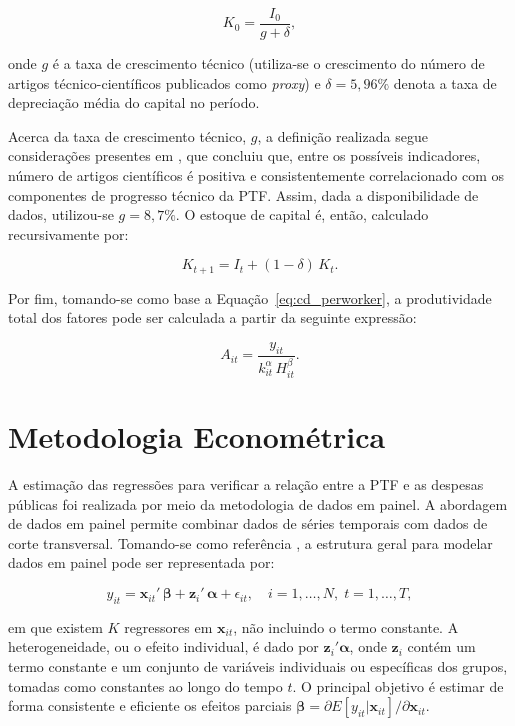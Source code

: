 \documentclass[
  12pt,
  a4paper,
  oneside,
  brazil,
  chapter=TITLE,
  section=TITLE
]{abntex2}
\begin{document}
\begin{equation}
  K_0 = \frac{I_0}{g + \delta},
  \label{eq:K0}
\end{equation}

\noindent onde $g$ é a taxa de crescimento técnico (utiliza-se o crescimento do número de artigos técnico-científicos publicados como \textit{proxy}) e $\delta = 5{,}96\%$ denota a taxa de depreciação média do capital no período.

Acerca da taxa de crescimento técnico, $g$, a definição realizada segue considerações presentes em , que concluiu que, entre os possíveis indicadores, número de artigos científicos é positiva e consistentemente correlacionado com os componentes de progresso técnico da PTF. Assim, dada a disponibilidade de dados, utilizou-se $g = 8{,}7\%$. O estoque de capital é, então, calculado recursivamente por:

\begin{equation}
  K_{t+1} = I_t + (1 - \delta)\,K_t.
  \label{eq:perpetual_inventory}
\end{equation}

Por fim, tomando-se como base a Equação~\eqref{eq:cd_perworker}, a produtividade total dos fatores pode ser calculada a partir da seguinte expressão:

\begin{equation}
  A_{it} = \frac{y_{it}}{k_{it}^{\alpha}\, H_{it}^{\beta}}.
  \label{eq:tfp}
\end{equation}

\section{Metodologia Econométrica}

A estimação das regressões para verificar a relação entre a PTF e as despesas públicas foi realizada por meio da metodologia de dados em painel. A abordagem de dados em painel permite combinar dados de séries temporais com dados de corte transversal. Tomando-se como referência , a estrutura geral para modelar dados em painel pode ser representada por:

\begin{equation}
  y_{it} = \mathbf{x}_{it}'\,\boldsymbol{\beta} + \mathbf{z}_i'\,\boldsymbol{\alpha} + \epsilon_{it}, \quad i = 1, \ldots, N,\; t = 1, \ldots, T,
  \label{eq:panel_general}
\end{equation}

\noindent em que existem $K$ regressores em $\mathbf{x}_{it}$, não incluindo o termo constante. A heterogeneidade, ou o efeito individual, é dado por $\mathbf{z}_i'\boldsymbol{\alpha}$, onde $\mathbf{z}_i$ contém um termo constante e um conjunto de variáveis individuais ou específicas dos grupos, tomadas como constantes ao longo do tempo $t$. O principal objetivo é estimar de forma consistente e eficiente os efeitos parciais $\boldsymbol{\beta} = \partial E[y_{it}|\mathbf{x}_{it}]/\partial\mathbf{x}_{it}$.
\end{document}
